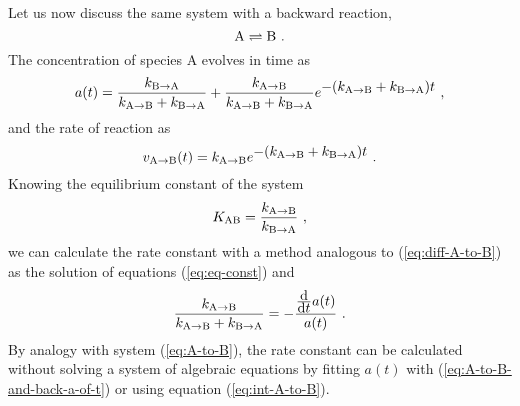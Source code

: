 Let us now discuss the same system with a backward reaction,
\begin{equation}
\label{eq:A-to-B-to-A}
{\centering
\rm A \rightleftharpoons B} ~.
\end{equation}
The concentration of species A evolves in time as
\begin{equation}
\label{eq:A-to-B-and-back-a-of-t}
a(t) = \frac{k_{\rm B \rightarrow A}}{k_{\rm A \rightarrow B} + k_{\rm B \rightarrow A}} + \frac{k_{\rm A \rightarrow B}}{k_{\rm A \rightarrow B} + k_{\rm B \rightarrow A}} e^{\displaystyle{- (k_{\rm A \rightarrow B} + k_{\rm B \rightarrow A}) t}} ~,
\end{equation}
and the rate of reaction as
\begin{equation}
\label{eq:A-to-B-and-back-v-of-t}
v_{\rm A \rightarrow B}(t) = k_{\rm A \rightarrow B} e^{\displaystyle{- (k_{\rm A \rightarrow B} + k_{\rm B \rightarrow A}) t}} ~.
\end{equation}
Knowing the equilibrium constant of the system
\begin{equation}
\label{eq:eq-const}
K_{\rm A \/ B} = \frac{k_{\rm A \rightarrow B}}{k_{\rm B \rightarrow A}} ~,
\end{equation}
we can calculate the rate constant with a method analogous to (\ref{eq:diff-A-to-B}) as the solution of equations (\ref{eq:eq-const}) and
\begin{equation}
\frac{k_{\rm A \rightarrow B}}{k_{\rm A \rightarrow B} + k_{\rm B \rightarrow A}} = 
- \frac{ \frac{\displaystyle{\rm d}}{\displaystyle{{\rm d} t}} a(t)}{a(t)}
~.
\end{equation}
By analogy with system (\ref{eq:A-to-B}), the rate constant can be calculated without solving a system of algebraic equations by fitting $a(t)$ with (\ref{eq:A-to-B-and-back-a-of-t}) or using equation (\ref{eq:int-A-to-B}).


